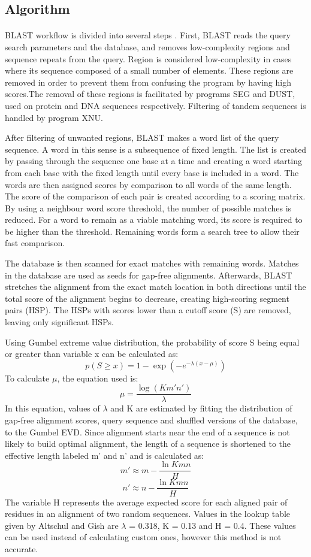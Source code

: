 \subsection{Algorithm}
\paragraph*{}
BLAST workflow is divided into several steps \cite{gollery2005bioinformatics}. First, BLAST reads the query search parameters and the database, and removes low-complexity regions and sequence repeats from the query. Region is considered low-complexity in cases where its sequence composed of a small number of elements. These regions are removed in order to prevent them from confusing the program by having high scores.The removal of these regions is facilitated by programs SEG and DUST, used on protein and DNA sequences respectively. Filtering of tandem sequences is handled by program XNU. 

After filtering of unwanted regions, BLAST makes a word list of the query sequence. A word in this sense is a subsequence of fixed length. The list is created by passing through the sequence one base at a time and creating a word starting from each base with the fixed length until every base is included in a word. The words are then assigned scores by comparison to all words of the same length. The score of the comparison of each pair is created according to a scoring matrix. By using a neighbour word score threshold, the number of possible matches is reduced. For a word to remain as a viable matching word, its score is required to be higher than the threshold. Remaining words form a search tree to allow their fast comparison.

The database is then scanned for exact matches with remaining words. Matches in the database are used as seeds for gap-free alignments. Afterwards, BLAST stretches the alignment from the exact match location in both directions until the total score of the alignment begins to decrease, creating high-scoring segment pairs (HSP). The HSPs with scores lower than a cutoff score (S) are removed, leaving only significant HSPs.

Using Gumbel extreme value distribution, the probability of score S being equal or greater than variable x can be calculated as:
\[ p(S \geq x) = 1 - \exp(-e^{-\lambda(x-\mu)}) \]
To calculate $\mu$, the equation used is:
\[ \mu = \frac{\log(K m' n')}{\lambda} \]
In this equation, values of $\lambda$ and K are estimated by fitting the distribution of gap-free alignment scores, query sequence and shuffled versions of the database, to the Gumbel EVD. Since alignment starts near the end of a sequence is not likely to build optimal alignment, the length of a sequence is shortened to the effective length labeled m' and n' and is calculated as:
\[ m' \approx m - \frac{\ln K m n}{H} \]
\[n' \approx n - \frac{\ln K m n}{H}\]
The variable H represents the average expected score for each aligned pair of residues in an alignment of two random sequences. Values in the lookup table given by Altschul and Gish are $\lambda$ = 0.318, K = 0.13 and H = 0.4. These values can be used instead of calculating custom ones, however this method is not accurate.


